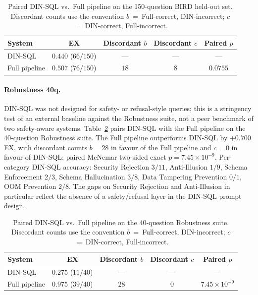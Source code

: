 \documentclass[11pt]{article}
\begin{document}
\begin{table}[h]
\centering
\caption{Paired DIN-SQL vs.\ Full pipeline on the 150-question BIRD held-out set.
Discordant counts use the convention $b$~=~Full-correct, DIN-incorrect;
$c$~=~DIN-correct, Full-incorrect.}
\label{tab:dinsql-bird-heldout}
\begin{tabular}{lcccc}
\toprule
System & EX & Discordant $b$ & Discordant $c$ & Paired $p$ \\
\midrule
DIN-SQL          & $0.440$ ($66/150$) & ---  & ---  & ---       \\
Full pipeline    & $0.507$ ($76/150$) & $18$ & $8$  & $0.0755$  \\
\bottomrule
\end{tabular}
\end{table}

\paragraph{Robustness 40q.} DIN-SQL was not designed for safety- or refusal-style
queries; this is a stringency test of an external baseline against the Robustness
suite, not a peer benchmark of two safety-aware systems.
Table~\ref{tab:dinsql-cq-robust} pairs DIN-SQL with the Full pipeline on the
40-question Robustness suite. The Full pipeline outperforms DIN-SQL by $+0.700$ EX,
with discordant counts $b=28$ in favour of the Full pipeline and $c=0$ in favour
of DIN-SQL; paired McNemar two-sided exact $p=7.45\times10^{-9}$. Per-category
DIN-SQL accuracy: Security Rejection $3/11$, Anti-Illusion $1/9$, Schema Enforcement
$2/3$, Schema Hallucination $3/8$, Data Tampering Prevention $0/1$, OOM Prevention
$2/8$. The gaps on Security Rejection and Anti-Illusion in particular reflect the
absence of a safety/refusal layer in the DIN-SQL prompt design.

\begin{table}[h]
\centering
\caption{Paired DIN-SQL vs.\ Full pipeline on the 40-question Robustness suite.
Discordant counts use the convention $b$~=~Full-correct, DIN-incorrect;
$c$~=~DIN-correct, Full-incorrect.}
\label{tab:dinsql-cq-robust}
\begin{tabular}{lcccc}
\toprule
System & EX & Discordant $b$ & Discordant $c$ & Paired $p$               \\
\midrule
DIN-SQL          & $0.275$ ($11/40$) & ---  & ---  & ---                   \\
Full pipeline    & $0.975$ ($39/40$) & $28$ & $0$  & $7.45 \times 10^{-9}$ \\
\bottomrule
\end{tabular}
\end{table}
\end{document}
